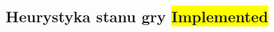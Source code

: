 \subsection{Heurystyka stanu gry \colorbox{yellow}{Implemented}}
\label{subsec:heurystyka-stanu-gry}